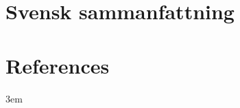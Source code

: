 \documentclass[twoside,10pt]{gihclass} %
\begin{document}
\hypertarget{svensk-sammanfattning}{%
\chapter{Svensk sammanfattning}\label{svensk-sammanfattning}}

\backmatter

\hypertarget{references}{%
\chapter*{References}\label{references}}


\noindent

\setlength{\parskip}{4pt}

\rightskip3em

\footnotesize
\end{document}
